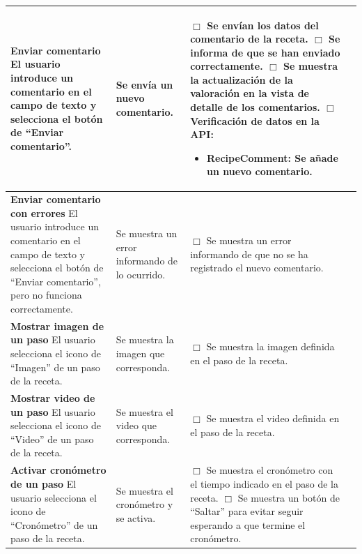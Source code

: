 \begin{center}
\begin{longtable}{|p{3.75cm}|p{3.5cm}|p{5.25cm}|p{1.5cm}|}
    \textbf{Enviar comentario}\newline
    El usuario introduce un comentario en el campo de texto y selecciona el
    botón de ``Enviar comentario''. &
    Se envía un nuevo comentario. &
    $\Box$ Se envían los datos del comentario de la receta.\newline
    $\Box$ Se informa de que se han enviado correctamente.\newline
    $\Box$ Se muestra la actualización de la valoración en la vista de
    detalle de los comentarios.\newline
    $\Box$ Verificación de datos en la API:
    \begin{itemize}
    \item RecipeComment: Se añade un nuevo comentario.
    \end{itemize}
    & \\ \hline

    \textbf{Enviar comentario con errores}\newline
    El usuario introduce un comentario en el campo de texto y selecciona el
    botón de ``Enviar comentario'', pero no funciona correctamente. &
    Se muestra un error informando de lo ocurrido. &
    $\Box$ Se muestra un error informando de que no se ha registrado el nuevo
    comentario. & \\ \hline

    \textbf{Mostrar imagen de un paso}\newline
    El usuario selecciona el icono de ``Imagen'' de un paso de la receta. &
    Se muestra la imagen que corresponda. &
    $\Box$ Se muestra la imagen definida en el paso de la receta.
    & \\ \hline
    
    \textbf{Mostrar video de un paso}\newline
    El usuario selecciona el icono de ``Video'' de un paso de la receta. &
    Se muestra el video que corresponda. &
    $\Box$ Se muestra el video definida en el paso de la receta.
    & \\ \hline

    \textbf{Activar cronómetro de un paso}\newline
    El usuario selecciona el icono de ``Cronómetro'' de un paso de la receta. &
    Se muestra el cronómetro y se activa. &
    $\Box$ Se muestra el cronómetro con el tiempo indicado en el paso de la
    receta.\newline
    $\Box$ Se muestra un botón de ``Saltar'' para evitar seguir esperando a que
    termine el cronómetro.    
    & \\ \hline


\end{longtable}
\end{center}
